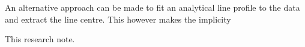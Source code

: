 \documentclass[rnaas]{aastex62}
\newcommand{\figurelabel}[1]{\label{fig:#1}}
\renewcommand{\eqref}[1]{\ref{eq:#1}}
\newcommand{\Eq}[1]{Equation~(\eqref{#1})}
\newcommand{\eq}[1]{\Eq{#1}}
\newcommand{\bvec}[1]{{\ensuremath{\boldsymbol{#1}}}}
\begin{document}
An alternative approach can be made to fit an analytical line profile to the data and extract the line centre. This however makes the implicity

This research note. \citep{Perez:2018}



\end{document}
